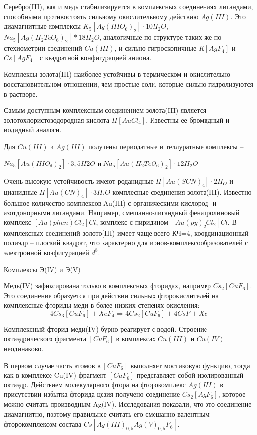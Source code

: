 \documentclass[11pt]{article}
\begin{document}
Серебро(III), как и медь стабилизируется в комплексных соединениях лигандами,
способными противостоять сильному окислительному действию $Ag(III)$. Это
диамагнитные комплексы $K_5[Ag(HIO_6)_2]\cdot10H_2O$, $Na_5[Ag(H_2TeO_6)_2]*18H_2O$, аналогичные
по структуре таких же по стехиометрии соединений $Cu(III)$, и сильно гигроскопичные
$K[AgF_4]$ и $Cs[AgF_4]$ с квадратной конфигурацией аниона.

Комплексы золота(III) наиболее устойчивы в термическом и окислительно-
восстановительном отношении, чем простые соли, которые сильно гидролизуются в растворе.

Самым доступным комплексным соединением золота(III) является
золотохлористоводородная кислота $H[AuCl_4]$. Известны ее бромидный и иодидный
аналоги.

Для $Cu(III)$ и $Ag(III)$ получены периодатные и теллуратные комплексы –

$Na_5[Au(HIO_6)_2]\cdot3,5H2O$ и $Na_5[Au(H_2TeO_6)_2]\cdot12H_2O$

Oчень высокую устойчивость имеют роданидные $H[Au(SCN)_4]\cdot2H_O$ и цианидные
$H[Au(CN)_4]\cdot3H_2O$ комплесные соединения золота(III).
Известно большое количество комплексов Au(III) с органическими кислород- и
азотдонорными лигандами. Hапример, смешанно-лигандный фенатролиновый комплекс
$[Au(phen)Cl_2]Cl$, комплекс с пиридином $[Au(py)_2Cl_2]Cl$.
В комплексных соединений золото(III) имеет чаще всего КЧ=4, координационный
полиэдр – плоский квадрат, что характерно для ионов-комплексообразователей с
электронной конфигурацией $d^8$.

Комплексы Э(IV) и Э(V)

Медь(IV) зафиксирована только в комплексных фторидах, например $Cs_2[CuF_6]$.
Это соединение образуется при действии сильных фторокислителей на комплексные
фториды меди в более низких степенях окисления:
$$4Cs_3[CuF_6] + XeF_4 \Rightarrow 4Cs_2[CuF_6] + 4CsF + Xe$$

Комплексный фторид меди(IV) бурно реагирует с водой. Строение
октаэдрического фрагмента $[CuF_6]$ в комплексах $Cu(III)$ и $Cu(IV)$ неодинаково. 

В первом случае часть атомов в $[CuF_6]$ выполняет мостиковую функцию, тогда как в комплексе
Cu(IV) фрагмент $[CuF_6]$ представляет собой изолированный октаэдр.
Действием молекулярного фтора на фторокомплекс $Ag(III)$ в присутствии избытка
фторида цезия получено соединение $Cs_2[AgF_6]$, которое можно считать производным
Ag(IV). Исследования показали, что это соединение диамагнитно, поэтому правильнее
считать его смешанно-валентным фторокомплексом состава $Cs[Ag(III)_{0,5} Ag(V)_{0,5}F_6]$.
\end{document}

